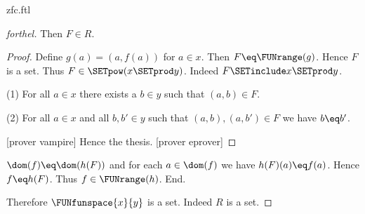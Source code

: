 \documentclass{naproche-library}
\begin{document}
\begin{smodule}[title=ZFC]{zfc.ftl}
\begin{proof}[forthel]
    Then $F \in R$.
    \begin{proof}
      Define $g(a) = (a,f(a))$ for $a \in x$.
      Then $F \eq \FUNrange(g)$.
      Hence $F$ is a set.
      Thus $F \in \SETpow(x \SETprod y)$.
      Indeed $F \SETinclude x \SETprod y$.

      (1) For all $a \in x$ there exists a $b \in y$ such that $(a,b) \in F$.

      (2) For all $a \in x$ and all $b, b' \in y$ such that $(a,b),
      (a,b') \in F$ we have $b \eq b'$.

      [prover vampire]
      Hence the thesis.
      [prover eprover]
    \end{proof}

    $\dom(f) \eq \dom(h(F))$ and for each $a \in \dom(f)$ we have $h(F)(a) \eq f(a)$.
    Hence $f \eq h(F)$.
    Thus $f \in \FUNrange(h)$.
  End.

  Therefore $\FUNfunspace{x}{y}$ is a set.
  Indeed $R$ is a set.
\end{proof}
\end{smodule}
\end{document}
